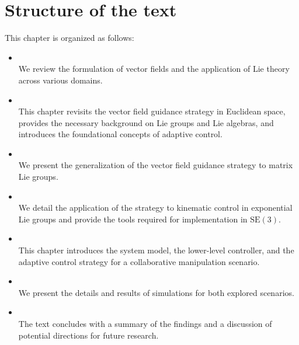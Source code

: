 \section{Structure of the text}
This chapter is organized as follows:
\begin{itemize}
    \item {}\\
    We review the formulation of vector fields and the application of Lie theory across various domains.
    \item {}\\
    This chapter revisits the vector field guidance strategy in Euclidean space, provides the necessary background on Lie groups and Lie algebras, and introduces the foundational concepts of adaptive control.
    \item {}\\
    We present the generalization of the vector field guidance strategy to matrix Lie groups.
    \item {}\\
    We detail the application of the strategy to kinematic control in exponential Lie groups and provide the tools required for implementation in $\text{SE}(3)$.
    \item {}\\
    This chapter introduces the system model, the lower-level controller, and the adaptive control strategy for a collaborative manipulation scenario.
    \item {}\\
    We present the details and results of simulations for both explored scenarios.
    \item {}\\
    The text concludes with a summary of the findings and a discussion of potential directions for future research.
\end{itemize}

